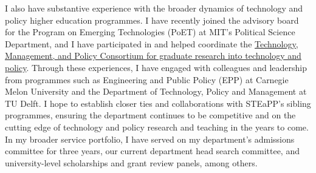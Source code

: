 \documentclass[11pt]{letter}
\begin{document}
\begin{letter}
I also have substantive experience with the broader dynamics of technology and policy higher education programmes.
%
I have recently joined the advisory board for the Program on Emerging Technologies (PoET) at MIT's Political Science Department, and I have participated in and helped coordinate the \href{https://www.tudelft.nl/en/tpm/about-the-faculty/organisation-chart-facts-figures/mission}{Technology, Management, and Policy Consortium for graduate research into technology and policy}.  
%
Through these experiences, I have engaged with colleagues and leadership from programmes such as Engineering and Public Policy (EPP) at Carnegie Melon University and the Department of Technology, Policy and Management at TU Delft.
%
I hope to establish closer ties and collaborations with STEaPP's sibling programmes, ensuring the department continues to be competitive and on the cutting edge of technology and policy research and teaching in the years to come.
%
In my broader service portfolio, I have served on my department's admissions committee for three years, our current department head search committee, and university-level scholarships and grant review panels, among others.





\end{letter}
\end{document}
